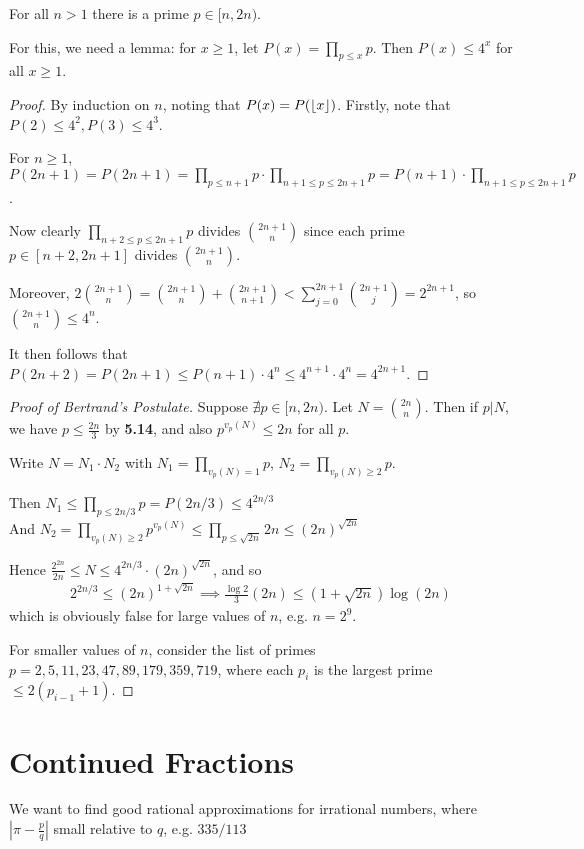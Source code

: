 \documentclass[10pt,a4paper]{article}
\begin{document}
\begin{theorem}
For all $n > 1$ there is a prime $p \in [n, 2n)$.
\end{theorem}
For this, we need a lemma: for $x \geq 1$, let $P(x) = \prod_{p\leq x} p$. Then $P(x) \leq 4^x$ for all $x \geq 1$.
\begin{proof}
By induction on $n$, noting that $P(x) = P(\lfloor x \rfloor)$. Firstly, note that $P(2) \leq 4^2, P(3) \leq 4^3$.

For $n\geq 1$, $P(2n+1) = P(2n+1) = \prod_{p\leq n+1} p \cdot \prod_{n+1\leq p\leq 2n+1} p = P(n+1) \cdot \prod_{n+1 \leq p\leq 2n+1} p$.

Now clearly $\prod_{n+2\leq p\leq 2n+1}p$ divides $\binom{2n+1}{n}$ since each prime $p \in [n+2, 2n+1]$ divides $\binom{2n+1}{n}$. 

Moreover, $2\binom{2n+1}{n} = \binom{2n+1}{n} + \binom{2n+1}{n+1} < \sum_{j=0}^{2n+1} \binom{2n+1}{j} = 2^{2n+1}$, so $\binom{2n+1}{n}\leq 4^n$.

It then follows that $P(2n+2)=P(2n+1)\leq P(n+1)\cdot 4^n \leq 4^{n+1}\cdot 4^n = 4^{2n+1}$.
\end{proof}
\begin{proof}[Proof of Bertrand's Postulate]
Suppose $\nexists p \in [n,2n)$. Let $N = \binom{2n}{n}$. Then if $p|N$, we have $p \leq \frac{2n}{3}$ by \textbf{5.14}, and also $p^{v_p(N)} \leq 2n$ for all $p$.

Write $N = N_1 \cdot N_2$ with $N_1 = \prod_{v_p(N) = 1} p$, $N_2 = \prod_{v_p(N) \geq 2} p$.

Then $N_1 \leq \prod_{p\leq 2n/3} p = P(2n/3) \leq 4^{2n/3}$\\
And $N_2 = \prod_{v_p(N)\geq 2} p^{v_p(N)} \leq \prod_{p\leq \sqrt{2n}} 2n \leq (2n)^{\sqrt{2n}}$

Hence $\frac{2^{2n}}{2n} \leq N \leq 4^{2n/3} \cdot(2n)^{\sqrt{2n}}$, and so
\begin{align*}
2^{2n/3} \leq (2n)^{1+\sqrt{2n}} \implies \frac{\log 2}{3} (2n) \leq (1+\sqrt{2n})\log(2n)
\end{align*}
which is obviously false for large values of $n$, e.g. $n = 2^9$.

For smaller values of $n$, consider the list of primes $p=2,5,11,23,47,89,179,359,719$, where each $p_i$ is the largest prime $\leq 2(p_{i-1}+1)$.
\end{proof}

\section{Continued Fractions}
We want to find good rational approximations for irrational numbers, where $|\pi - \frac{p}{q}|$ small relative to $q$, e.g. $335/113$
\end{document}
